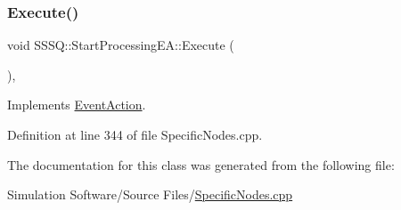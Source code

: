 \subsubsection{\texorpdfstring{Execute()}{Execute()}}
{\footnotesize\ttfamily void S\+S\+S\+Q\+::\+Start\+Processing\+E\+A\+::\+Execute (\begin{DoxyParamCaption}{ }\end{DoxyParamCaption})\hspace{0.3cm}{\ttfamily [inline]}, {\ttfamily [virtual]}}



Implements \hyperlink{class_event_action_a62b9d07abb4ca8e7c078b076a1ab1a9f}{Event\+Action}.



Definition at line 344 of file Specific\+Nodes.\+cpp.



The documentation for this class was generated from the following file\+:\begin{DoxyCompactItemize}
\item 
Simulation Software/\+Source Files/\hyperlink{_specific_nodes_8cpp}{Specific\+Nodes.\+cpp}\end{DoxyCompactItemize}
